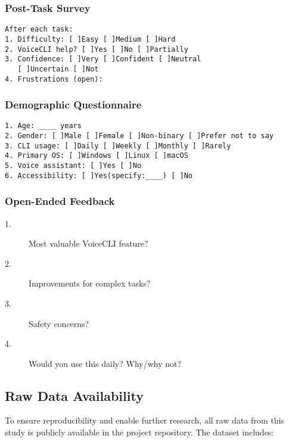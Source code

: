 \documentclass[a4paper,12pt]{article}
\begin{document}
\subsubsection*{Post-Task Survey}
\begin{verbatim}
After each task: 
1. Difficulty: [ ]Easy [ ]Medium [ ]Hard
2. VoiceCLI help? [ ]Yes [ ]No [ ]Partially
3. Confidence: [ ]Very [ ]Confident [ ]Neutral 
   [ ]Uncertain [ ]Not
4. Frustrations (open):
\end{verbatim}

\subsubsection*{Demographic Questionnaire}
\begin{verbatim}
1. Age: ____ years  
2. Gender: [ ]Male [ ]Female [ ]Non-binary [ ]Prefer not to say
3. CLI usage: [ ]Daily [ ]Weekly [ ]Monthly [ ]Rarely
4. Primary OS: [ ]Windows [ ]Linux [ ]macOS
5. Voice assistant: [ ]Yes [ ]No  
6. Accessibility: [ ]Yes(specify:____) [ ]No
\end{verbatim}

\subsubsection*{Open-Ended Feedback}

\begin{description}
\item[1.] {Most valuable VoiceCLI feature?}
\item[2.] {Improvements for complex tasks?}
\item[3.] {Safety concerns?}
\item[4.] {Would you use this daily? Why/why not?}
\end{description}

\subsection*{Raw Data Availability}
\label{sec:raw-data}

To ensure reproducibility and enable further research, all raw data from this study is publicly available in the project repository. The dataset includes:
\end{document}
